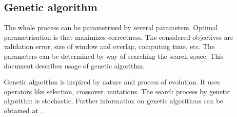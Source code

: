 \documentclass[a4paper]{IEEEtran}
\begin{document}
\subsection{Genetic algorithm}
The whole process can be parametrised by several parameters. Optimal parametrisation 
is that maximizes correctness.
The considered objectives are validation error, size of window and overlap, 
computing time, etc.
The parameters can be determined by way of searching the search space. 
This document describes usage of genetic algorithm.

Genetic algorithm is inspired by nature and process of evolution.
It uses operators like selection, crossover, mutations. 
The search process by genetic algorithm is stochastic.
Further information on genetic algorithms can be obtained at \cite{ga,gawiki}.
\end{document}
